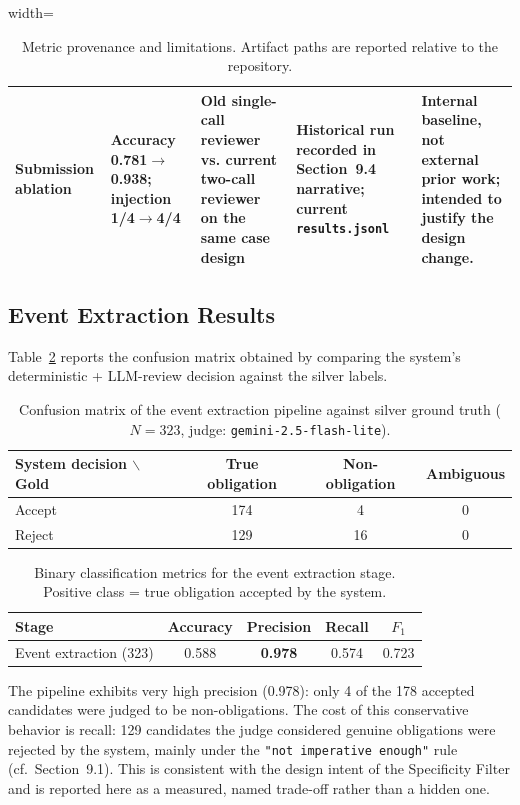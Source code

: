 \documentclass[a4paper,12pt]{article}
\begin{document}
\begin{table}[H]
\begin{adjustbox}{width=\textwidth}
\begin{tabular}{>{\raggedright\arraybackslash}p{3.0cm}>{\raggedright\arraybackslash}p{2.2cm}>{\raggedright\arraybackslash}p{3.3cm}>{\raggedright\arraybackslash}p{3.6cm}>{\raggedright\arraybackslash}p{4.4cm}}
Submission ablation & Accuracy 0.781$\rightarrow$0.938; injection 1/4$\rightarrow$4/4 & Old single-call reviewer vs. current two-call reviewer on the same case design & Historical run recorded in Section~9.4 narrative; current \texttt{results.jsonl} & Internal baseline, not external prior work; intended to justify the design change. \\
\bottomrule
\end{tabular}
\end{adjustbox}
\caption{Metric provenance and limitations. Artifact paths are reported relative to the repository.}
\label{tab:metric_provenance}
\end{table}

\subsection{Event Extraction Results}
Table~\ref{tab:event_confusion} reports the confusion matrix obtained by comparing the system's deterministic + LLM-review decision against the silver labels.

\begin{table}[H]
\centering
\begin{tabular}{l|ccc}
System decision $\backslash$ Gold & True obligation & Non-obligation & Ambiguous \\ \hline
Accept & 174 & 4 & 0 \\
Reject & 129 & 16 & 0 \\
\end{tabular}
\caption{Confusion matrix of the event extraction pipeline against silver ground truth ($N{=}323$, judge: \texttt{gemini-2.5-flash-lite}).}
\label{tab:event_confusion}
\end{table}

\begin{table}[H]
\centering
\begin{tabular}{lcccc}
\toprule
Stage & Accuracy & Precision & Recall & $F_1$ \\ \midrule
Event extraction (323) & 0.588 & \textbf{0.978} & 0.574 & 0.723 \\
\bottomrule
\end{tabular}
\caption{Binary classification metrics for the event extraction stage. Positive class = true obligation accepted by the system.}
\label{tab:event_metrics}
\end{table}

The pipeline exhibits very high precision (0.978): only 4 of the 178 accepted candidates were judged to be non-obligations. The cost of this conservative behavior is recall: 129 candidates the judge considered genuine obligations were rejected by the system, mainly under the \texttt{"not imperative enough"} rule (cf.\ Section~9.1). This is consistent with the design intent of the Specificity Filter and is reported here as a measured, named trade-off rather than a hidden one.
\end{document}
